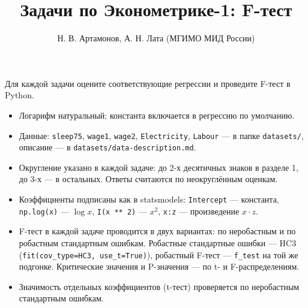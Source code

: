 \documentclass[
  russian,
]{article}
\title{Задачи по Эконометрике-1: F-тест}
\author{Н. В. Артамонов, А. Н. Лата (МГИМО МИД России)}
\date{}
\providecommand{\tightlist}{%
  \setlength{\itemsep}{0pt}\setlength{\parskip}{0pt}}
\renewcommand*\contentsname{Содержание}
\newcommand\contentsname{Содержание}
\begin{document}
\maketitle

\renewcommand*\contentsname{Содержание}
{
\setcounter{tocdepth}{3}
\tableofcontents
}

Для каждой задачи оцените соответствующие регрессии и проведите F-тест в
Python.

\begin{tcolorbox}[enhanced jigsaw, arc=.35mm, bottomrule=.15mm, bottomtitle=1mm, breakable, colback=white, colbacktitle=quarto-callout-important-color!10!white, colframe=quarto-callout-important-color-frame, coltitle=black, left=2mm, leftrule=.75mm, opacityback=0, opacitybacktitle=0.6, rightrule=.15mm, title=\textcolor{quarto-callout-important-color}{\faExclamation}\hspace{0.5em}{Важно}, titlerule=0mm, toprule=.15mm, toptitle=1mm]

\begin{itemize}
\tightlist
\item
  Логарифм натуральный; константа включается в регрессию по умолчанию.
\item
  Данные: \texttt{sleep75}, \texttt{wage1}, \texttt{wage2},
  \texttt{Electricity}, \texttt{Labour} --- в папке \texttt{datasets/},
  описание --- в \texttt{datasets/data-description.md}.
\item
  Округление указано в каждой задаче: до 2-х десятичных знаков в разделе
  1, до 3-х --- в остальных. Ответы считаются по неокруглённым оценкам.
\item
  Коэффициенты подписаны как в statsmodels: \texttt{Intercept} ---
  константа, \texttt{np.log(x)} --- \(\log x\), \texttt{I(x\ **\ 2)} ---
  \(x^2\), \texttt{x:z} --- произведение \(x\cdot z\).
\item
  F-тест в каждой задаче проводится в двух вариантах: по неробастным и
  по робастным стандартным ошибкам. Робастные стандартные ошибки --- HC3
  (\texttt{fit(cov\_type=\textquotesingle{}HC3\textquotesingle{},\ use\_t=True)}),
  робастный F-тест --- \texttt{f\_test} на той же подгонке. Критические
  значения и P-значения --- по t- и F-распределениям.
\item
  Значимость отдельных коэффициентов (t-тест) проверяется по неробастным
  стандартным ошибкам.
\end{itemize}

\end{tcolorbox}
\end{document}
